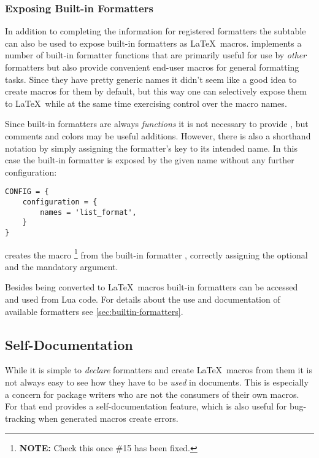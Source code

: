 \documentclass{scrartcl}
\begin{document}
\subsubsection{Exposing Built-in Formatters}
\label{sec:exposing-builtin-formatters}

In addition to completing the information for registered formatters the
 subtable can also be used to expose built-in formatters
as \LaTeX\ macros.  implements a number of built-in
formatter functions that are primarily useful for use by \emph{other} formatters
but also provide convenient end-user macros for general formatting tasks.  Since
they have pretty generic names it didn't seem like a good idea to create macros
for them by default, but this way one can selectively expose them to \LaTeX\
while at the same time exercising control over the macro names.

Since built-in formatters are always \emph{functions} it is not necessary to
provide \luavar{args}, but comments and colors may be useful additions. However,
there is also a shorthand notation by simply assigning the formatter's key to
its intended name.  In this case the built-in formatter is exposed by the given
name without any further configuration:

\begin{verbatim}
CONFIG = {
    configuration = {
        names = 'list_format',
    }
}
\end{verbatim}

\noindent creates the macro %
\footnote{\textbf{NOTE:} Check this once \#15 has been fixed.}
from the built-in formatter , correctly assigning the
optional and the mandatory \luavar{text} argument.

Besides being converted to \LaTeX\ macros built-in formatters can be accessed
and used from Lua code.  For details about the use and documentation of
available formatters see \vref{sec:builtin-formatters}.


\subsection{Self-Documentation}
\label{sec:self-documentation}

While it is simple to \emph{declare} formatters and create \LaTeX\ macros from
them it is not always easy to see how they have to be \emph{used} in documents.
This is especially a concern for package writers who are not the consumers of
their own macros.  For that end \package{luatemplates} provides a
self-documentation feature, which is also useful for bug-tracking when generated
macros create errors.
\end{document}
